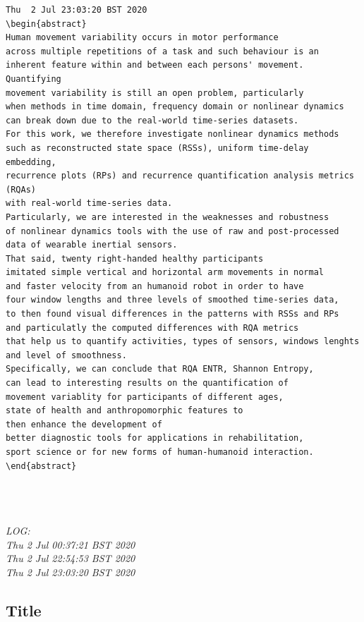 \documentclass[10pt]{article}
\begin{document}
\begin{enumerate}
\begin{verbatim}
Thu  2 Jul 23:03:20 BST 2020
\begin{abstract}
Human movement variability occurs in motor performance 
across multiple repetitions of a task and such behaviour is an
inherent feature within and between each persons' movement. Quantifying
movement variability is still an open problem, particularly 
when methods in time domain, frequency domain or nonlinear dynamics 
can break down due to the real-world time-series datasets. 
For this work, we therefore investigate nonlinear dynamics methods 
such as reconstructed state space (RSSs), uniform time-delay embedding, 
recurrence plots (RPs) and recurrence quantification analysis metrics (RQAs)
with real-world time-series data.
Particularly, we are interested in the weaknesses and robustness 
of nonlinear dynamics tools with the use of raw and post-processed 
data of wearable inertial sensors. 
That said, twenty right-handed healthy participants 
imitated simple vertical and horizontal arm movements in normal 
and faster velocity from an humanoid robot in order to have 
four window lengths and three levels of smoothed time-series data,
to then found visual differences in the patterns with RSSs and RPs
and particulatly the computed differences with RQA metrics
that help us to quantify activities, types of sensors, windows lenghts 
and level of smoothness. 
Specifically, we can conclude that RQA ENTR, Shannon Entropy, 
can lead to interesting results on the quantification of 
movement variablity for participants of different ages, 
state of health and anthropomorphic features to 
then enhance the development of 
better diagnostic tools for applications in rehabilitation, 
sport science or for new forms of human-humanoid interaction.
\end{abstract}




\end{verbatim}

	\textit{
	LOG:\\ 
	Thu  2 Jul 00:37:21 BST 2020\\
	Thu  2 Jul 22:54:53 BST 2020\\
	Thu  2 Jul 23:03:20 BST 2020
	}
	\\




\end{enumerate}



\subsection{Title}
\end{document}
